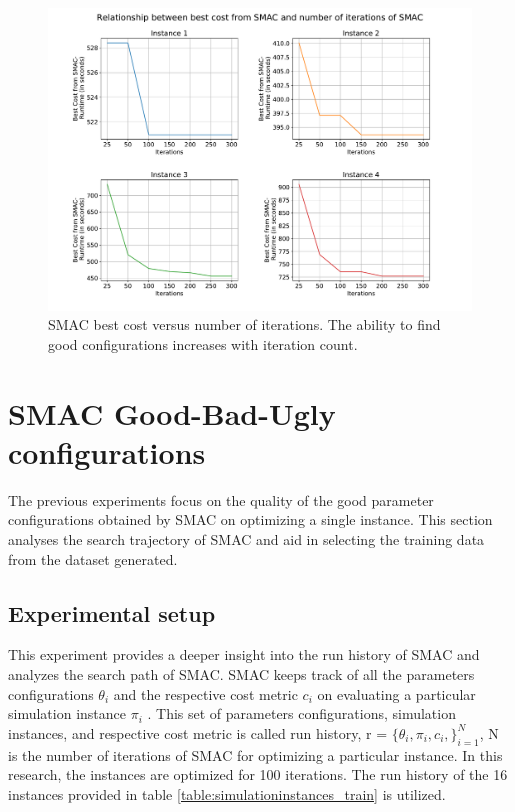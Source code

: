 \begin{figure}[!h]
\centering
\includegraphics[width=\textwidth]{images/Iteration_vs_cost.pdf}
\captionsetup{justification=justified}
\caption[An illustration of SMAC best cost versus iteration count]{SMAC best cost versus number of iterations. The ability to find good configurations increases with iteration count.}
\label{fig:experiment3_results}
\end{figure}

\section{SMAC Good-Bad-Ugly configurations}

The previous experiments focus on the quality of the good parameter configurations obtained by SMAC on optimizing a single instance. This section analyses the search trajectory of SMAC and aid in selecting the training data from the dataset generated.


\subsection{Experimental setup}
This experiment provides a deeper insight into the run history of SMAC and analyzes the search path of SMAC. SMAC keeps track of all the parameters configurations $\theta_i$ and the respective cost metric $c_i$ on evaluating a particular simulation instance $\pi_i$ \cite{CAVE_paper}. This set of parameters configurations, simulation instances, and respective cost metric is called run history, r = $\{\theta_i, \pi_i, c_i,\}_{i=1}^N$, N is the number of iterations of SMAC for optimizing a particular instance. In this research, the instances are optimized for 100 iterations. The run history of the 16 instances provided in table \ref{table:simulationinstances_train} is utilized. 

